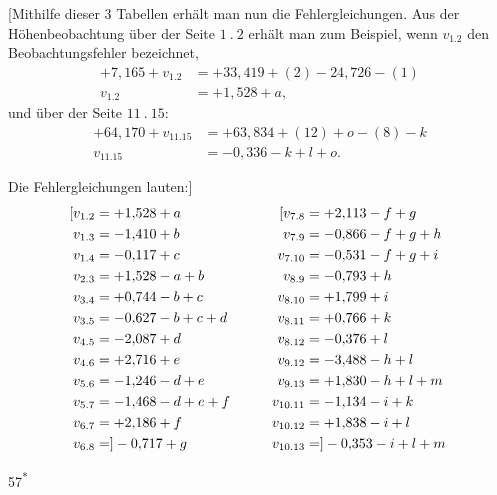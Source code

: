 \par\medskip
\par\noindent\hspace*{\parindent}[Mithilfe dieser 3 Tabellen erhält man nun die Fehlergleichungen.
Aus der Höhenbeobachtung über der Seite \(1\ .\ 2\) erhält man zum Beispiel, wenn \(v_{1.2}\)
den Beobachtungsfehler bezeichnet,
\[
\begin{aligned}
+7{,}165+v_{1.2}&=+33{,}419+(2)-24{,}726-(1)\\
v_{1.2}&=+1{,}528+a,
\end{aligned}
\]
\noindent und über der Seite \(11\ .\ 15\):
\[
\begin{aligned}
+64{,}170+v_{11.15}&=+63{,}834+(12)+o-(8)-k\\
v_{11.15}&=-0{,}336-k+l+o.
\end{aligned}
\]
\par\noindent\hspace*{\parindent}Die Fehlergleichungen lauten:]
\[
\begin{aligned}
\makebox[0pt][r]{[}v_{1.2}&=+1{,}528+a &\qquad \makebox[0pt][r]{[}v_{7.8}&=+2{,}113-f+g\\
v_{1.3}&=-1{,}410+b &\qquad v_{7.9}&=-0{,}866-f+g+h\\
v_{1.4}&=-0{,}117+c &\qquad v_{7.10}&=-0{,}531-f+g+i\\
v_{2.3}&=+1{,}528-a+b &\qquad v_{8.9}&=-0{,}793+h\\
v_{3.4}&=+0{,}744-b+c &\qquad v_{8.10}&=+1{,}799+i\\
v_{3.5}&=-0{,}627-b+c+d &\qquad v_{8.11}&=+0{,}766+k\\
v_{4.5}&=-2{,}087+d &\qquad v_{8.12}&=-0{,}376+l\\
v_{4.6}&=+2{,}716+e &\qquad v_{9.12}&=-3{,}488-h+l\\
v_{5.6}&=-1{,}246-d+e &\qquad v_{9.13}&=+1{,}830-h+l+m\\
v_{5.7}&=-1{,}468-d+e+f &\qquad v_{10.11}&=-1{,}134-i+k\\
v_{6.7}&=+2{,}186+f &\qquad v_{10.12}&=+1{,}838-i+l\\
v_{6.8}&=]-0{,}717+g &\qquad v_{10.13}&=]-0{,}353-i+l+m\\
\end{aligned}
\]
\par\smallskip\noindent\hfill{\footnotesize 57\textsuperscript{*}}\hspace*{.12\linewidth}\par

